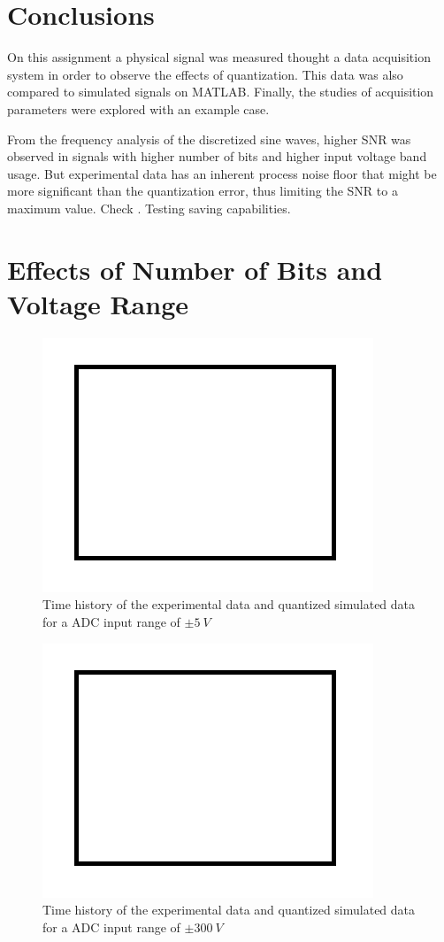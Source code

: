 \documentclass[10pt,letterpaper,twocolumn]{article}
\begin{document}
\section{Conclusions}
    On this assignment a physical signal was measured thought a data acquisition system in order to observe the effects of quantization. This data was also compared to simulated signals on MATLAB. Finally, the studies of acquisition parameters were explored with an example case.
    
    From the frequency analysis of the discretized sine waves, higher SNR was observed in signals with higher number of bits and higher input voltage band usage. But experimental data has an inherent process noise floor that might be more significant than the quantization error, thus limiting the SNR to a maximum value. Check \cite{einstein}. Testing saving capabilities.

\printbibliography

\onecolumn
\clearpage
\appendix
\appendixpage

\section{Effects of Number of Bits and Voltage Range}
    \begin{figure}[h]
    	\centering
        \includegraphics[width=0.6\linewidth]{img/sample}
        \captionsetup{width=0.6\textwidth}
        \caption{Time history of the experimental data and quantized simulated data for a ADC input range of $\pm 5\ V$}
        \label{fig:range5}
    \end{figure}
    
    \begin{figure}[h]
        \centering
        \includegraphics[width=0.6\linewidth]{img/sample}
        \captionsetup{width=0.6\textwidth}
        \caption{Time history of the experimental data and quantized simulated data for a ADC input range of $\pm 300\ V$}
        \label{fig:range300}
    \end{figure}
    
\end{document}
